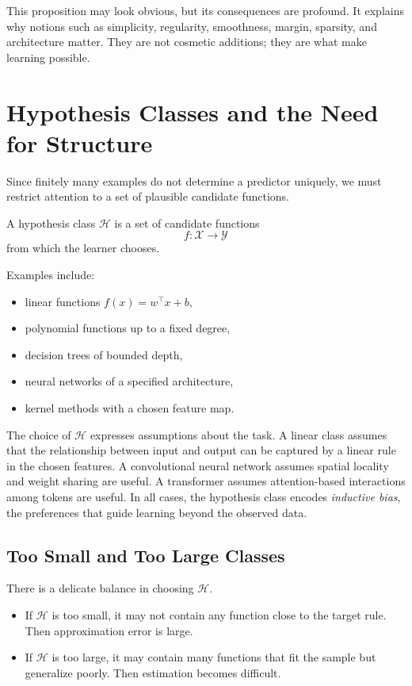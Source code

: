This proposition may look obvious, but its consequences are profound. It explains why notions such as simplicity, regularity, smoothness, margin, sparsity, and architecture matter. They are not cosmetic additions; they are what make learning possible.

\section{Hypothesis Classes and the Need for Structure}

Since finitely many examples do not determine a predictor uniquely, we must restrict attention to a set of plausible candidate functions.

\begin{definition}
A hypothesis class $\mathcal{H}$ is a set of candidate functions
\[
f : \mathcal{X}\to\mathcal{Y}
\]
from which the learner chooses.
\end{definition}

Examples include:
\begin{itemize}
    \item linear functions $f(x)=w^\top x + b$,
    \item polynomial functions up to a fixed degree,
    \item decision trees of bounded depth,
    \item neural networks of a specified architecture,
    \item kernel methods with a chosen feature map.
\end{itemize}

The choice of $\mathcal{H}$ expresses assumptions about the task. A linear class assumes that the relationship between input and output can be captured by a linear rule in the chosen features. A convolutional neural network assumes spatial locality and weight sharing are useful. A transformer assumes attention-based interactions among tokens are useful. In all cases, the hypothesis class encodes \emph{inductive bias}, the preferences that guide learning beyond the observed data.

\subsection{Too Small and Too Large Classes}

There is a delicate balance in choosing $\mathcal{H}$.
\begin{itemize}
    \item If $\mathcal{H}$ is too small, it may not contain any function close to the target rule. Then approximation error is large.
    \item If $\mathcal{H}$ is too large, it may contain many functions that fit the sample but generalize poorly. Then estimation becomes difficult.
\end{itemize}

